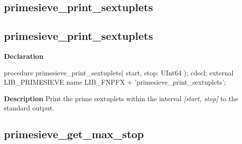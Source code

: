 \documentclass{report}
\newif\ifpdf
\begin{document}
\subsection*{\large{\textbf{primesieve{\_}print{\_}sextuplets}}\normalsize\hspace{1ex}\hrulefill}
\else
\subsection*{primesieve{\_}print{\_}sextuplets}
\fi
\label{primesieve-primesieve_print_sextuplets}
\begin{list}{}{
\setlength{\itemindent}{0cm}
\setlength{\listparindent}{0cm}
\setlength{\leftmargin}{\evensidemargin}
\addtolength{\leftmargin}{\tmplength}
\settowidth{\labelsep}{X}
\addtolength{\leftmargin}{\labelsep}
\setlength{\labelwidth}{\tmplength}
}
\item[\textbf{Declaration}\hfill]
\ifpdf
\begin{flushleft}
\fi
\begin{ttfamily}
procedure primesieve{\_}print{\_}sextuplets( start, stop: UInt64 ); cdecl; external LIB{\_}PRIMESIEVE name LIB{\_}FNPFX + 'primesieve{\_}print{\_}sextuplets';\end{ttfamily}

\ifpdf
\end{flushleft}
\fi

\par
\item[\textbf{Description}]
Print the prime sextuplets within the interval \textit{[start, stop]} to the standard output.

\end{list}
\ifpdf
\subsection*{\large{\textbf{primesieve{\_}get{\_}max{\_}stop}}\normalsize\hspace{1ex}\hrulefill}
\else
\end{document}
